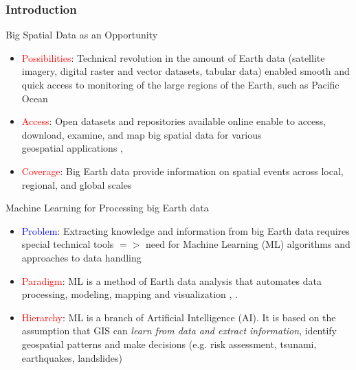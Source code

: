 \documentclass[pdflatex,compress,8pt,
	xcolor={dvipsnames,svgnames,x11names,table},
	hyperref={colorlinks = true,breaklinks = true, urlcolor = NavyBlue}]{beamer}
\begin{document}
\begin{frame}\frametitle{Introduction}

\begin{exampleblock}{Big Spatial Data as an Opportunity}
\begin{itemize}	
	\item \textcolor{red}{Possibilities}: Technical revolution in the amount of Earth data (satellite imagery, digital raster and vector datasets, tabular data) enabled smooth and quick access to monitoring of the large regions of the Earth, such as Pacific Ocean \cite{Lemenkova202106}
	\item \textcolor{red}{Access}: Open datasets and repositories available online enable to access, download, examine, and map big spatial data for various \\geospatial applications \cite{Baumannetal2015}, \cite{Lemenkova202103}
	\item \textcolor{red}{Coverage}: Big Earth data provide information on spatial events across local, regional, and global scales 
\end{itemize}
\end{exampleblock}

\begin{exampleblock}{Machine Learning for Processing big Earth data}
\begin{itemize}
	\item \textcolor{blue}{Problem}: Extracting knowledge and information from big Earth data requires special technical tools $=>$ need for Machine Learning (ML) algorithms and approaches to data handling \cite{Hanetal2019}
	\item \textcolor{red}{Paradigm}: ML is a method of Earth data analysis that automates data processing, modeling, mapping and visualization \cite{Lemenkova202021}, \cite{Lemenkova202102}. 
	\item \textcolor{red}{Hierarchy}: ML is a branch of Artificial Intelligence (AI). It is based on the assumption that GIS can \emph{learn from data and extract information}, identify geospatial patterns and make decisions (e.g. risk assessment, tsunami, earthquakes, landslides)
\end{itemize}
\end{exampleblock}
	
\end{frame}
\end{document}
